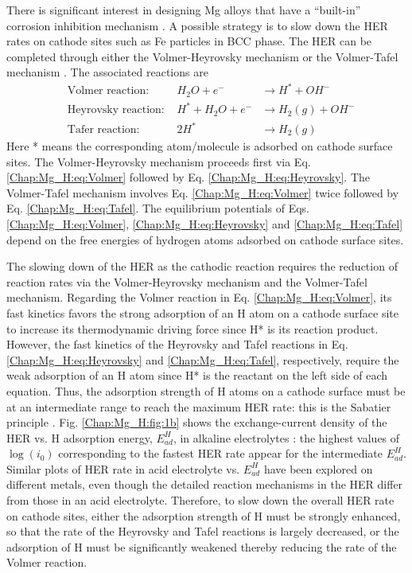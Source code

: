 There is significant interest in designing Mg alloys that have a “built-in” corrosion inhibition mechanism \cite{eaves2012inhibition}. A possible strategy is to slow down the HER rates on cathode sites such as Fe particles in \ac{BCC} phase. The HER can be completed through either the Volmer-Heyrovsky mechanism or the Volmer-Tafel mechanism \cite{ghali2010corrosion,walling1968electrochemical}. The associated reactions are
\begin{subequations}
\begin{align}
&\text{Volmer reaction:    } & H_2O + e^- & \rightarrow H^* + OH^-
 \label{Chap:Mg_H:eq:Volmer}\\
&\text{Heyrovsky reaction:    } & H^* + H_2O + e^- & \rightarrow H_2(g) + OH^-
 \label{Chap:Mg_H:eq:Heyrovsky}\\
&\text{Tafer reaction:    } 
& 2H^* & \rightarrow H_2(g)
 \label{Chap:Mg_H:eq:Tafel}
\end{align}
\end{subequations}
Here * means the corresponding atom/molecule is adsorbed on cathode surface sites. The Volmer-Heyrovsky mechanism proceeds first via Eq. \ref{Chap:Mg_H:eq:Volmer} followed by Eq. \ref{Chap:Mg_H:eq:Heyrovsky}. The Volmer-Tafel mechanism involves Eq. \ref{Chap:Mg_H:eq:Volmer} twice followed by Eq. \ref{Chap:Mg_H:eq:Tafel}. The equilibrium potentials of Eqs. \ref{Chap:Mg_H:eq:Volmer}, \ref{Chap:Mg_H:eq:Heyrovsky} and \ref{Chap:Mg_H:eq:Tafel} depend on the free energies of hydrogen atoms adsorbed on cathode surface sites. 


The slowing down of the HER as the cathodic reaction requires the reduction of reaction rates via the Volmer-Heyrovsky mechanism and the Volmer-Tafel mechanism. Regarding the Volmer reaction in Eq. \ref{Chap:Mg_H:eq:Volmer}, its fast kinetics favors the strong adsorption of an H atom on a cathode surface site to increase its thermodynamic driving force since H* is its reaction product. However, the fast kinetics of the Heyrovsky and Tafel reactions in Eq. \ref{Chap:Mg_H:eq:Heyrovsky} and \ref{Chap:Mg_H:eq:Tafel}, respectively, require the weak adsorption of an H atom since H* is the reactant on the left side of each equation. Thus, the adsorption strength of H atoms on a cathode surface must be at an intermediate range to reach the maximum \ac{HER} rate: this is the Sabatier principle \cite{medford2015sabatier}. Fig. \ref{Chap:Mg_H:fig:1b} shows the exchange-current density of the \ac{HER} vs. H adsorption energy, $E_{ad}^H$, in alkaline electrolytes \cite{sheng2013correlating}: the highest values of $\log(i_0)$ corresponding to the fastest \ac{HER} rate appear for the intermediate $E_{ad}^H$. Similar plots of \ac{HER} rate in acid electrolyte vs. $E_{ad}^H$ have been explored on different metals, even though the detailed reaction mechanisms in the \ac{HER} differ from those in an acid electrolyte. Therefore, to slow down the overall \ac{HER} rate on cathode sites, either the adsorption strength of H must be strongly enhanced, so that the rate of the Heyrovsky and Tafel reactions is largely decreased, or the adsorption of H must be significantly weakened thereby reducing the rate of the Volmer reaction. 

